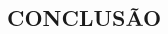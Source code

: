 \documentclass[article,12pt,oneside,a4paper,english,brazil]{unifil}
\begin{document}
\textual
\fontsize{12}{7}\selectfont
\begin{Spacing}{1.5}










\section*{CONCLUSÃO}

\end{Spacing}
\postextual


\end{document}
